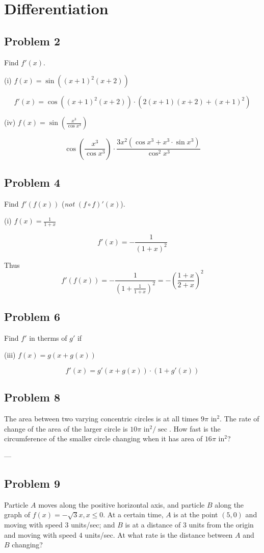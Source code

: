 
\section{Differentiation}

\subsection*{Problem 2}
Find $f'(x)$.

\vs

(i) $f(x)=\sin((x+1)^2(x+2))$

\[f'(x)=\cos((x+1)^2(x+2))\cdot(2(x+1)(x+2)+(x+1)^2)\]

\vs

(iv) $f(x)=\sin\left(\frac{x^3}{\cos x^3}\right)$

\[\cos\left(\frac{x^3}{\cos x^3}\right)\cdot \frac{3x^2(\cos x^3+x^3\cdot \sin
    x^3)}{\cos^2 x^3}\]


\subsection*{Problem 4}
Find $f'(f(x))$ (\textit{not} $(f\circ f)'(x)$).

\vs

(i) $f(x)=\frac{1}{1+x}$

\[f'(x)=-\frac{1}{(1+x)^2}\]

Thus
\[f'(f(x))=-\frac{1}{(1+\frac{1}{1+x})^2}=-\left(\frac{1+x}{2+x}\right)^2\]

\subsection*{Problem 6}
Find $f'$ in therms of $g'$ if

\vs

(iii) $f(x)=g(x+g(x))$

\[f'(x)=g'(x+g(x))\cdot (1+g'(x))\]

\subsection*{Problem 8}
The area between two varying concentric circles is at all times $9\pi$
in$^{2}$. The rate of change of the area of the larger circle is
$10\pi$ in$^2/\sec$. How fast is the circumference of the smaller circle
changing when it has area of $16\pi$ in$^2$?

\vs---\vs



\subsection*{Problem 9}
Particle $A$ moves along the positive horizontal axis, and particle
$B$ along the graph of $f(x)=-\sqrt{3}x,x\leq0$. At a certain time,
$A$ is at the point $(5,0)$ and moving with speed $3$ units/sec; and
$B$ is at a distance of 3 units from the origin and moving with speed
$4$ units/sec. At what rate is the distance between $A$ and $B$
changing?

